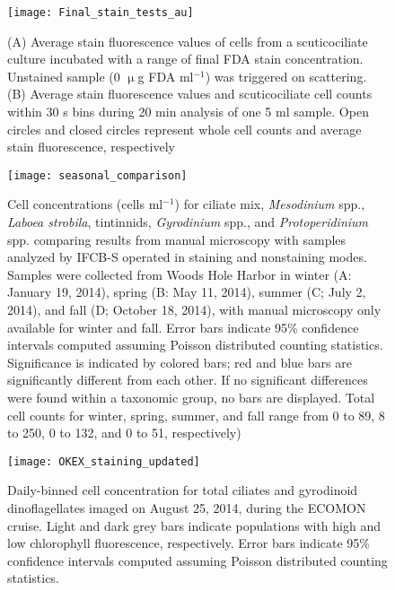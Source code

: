 \newpage
\begin{figure}

\graphicspath{ {Chapter2_Figures/} }
\texttt{[image: Final\_stain\_tests\_au]}
\caption [Testing stain protocol] {(A) Average stain fluorescence values of cells from a scuticociliate culture incubated with a range of final FDA stain concentration. Unstained sample (0 $\upmu$g FDA ml$^{-1}$) was triggered on scattering. (B) Average stain fluorescence values and scuticociliate cell counts within 30 s bins during 20 min analysis of one 5 ml sample. Open circles and closed circles represent whole cell counts and average stain fluorescence, respectively }
\label{arm:fig2}
\end{figure}

\begin{figure}

\graphicspath{ {Chapter2_Figures/} }
\texttt{[image: seasonal\_comparison]}
\caption [Seasonal comparisons between manual microscopy and IFCB-S] {Cell concentrations (cells ml$^{-1}$) for ciliate mix, \textit{Mesodinium} spp., \textit{Laboea strobila}, tintinnids, \textit{Gyrodinium} spp., and \textit{Protoperidinium} spp. comparing results from manual microscopy with samples analyzed by IFCB-S operated in staining and nonstaining modes. Samples were collected from Woods Hole Harbor in winter (A: January 19, 2014), spring (B: May 11, 2014), summer (C; July 2, 2014), and fall (D; October 18, 2014), with manual microscopy only available for winter and fall. Error bars indicate 95\% confidence intervals computed assuming Poisson distributed counting statistics. Significance is indicated by colored bars; red and blue bars are significantly different from each other. If no significant differences were found within a taxonomic group, no bars are displayed. Total cell counts for winter, spring, summer, and fall range from 0 to 89, 8 to 250, 0 to 132, and 0 to 51, respectively)}
\label{arm:fig2}
\end{figure}

\begin{figure}

\graphicspath{ {Chapter2_Figures/} }
\texttt{[image: OKEX\_staining\_updated]}
\caption [OKEX cruise comparison between staining and non-staining on IFCB-S] {Daily-binned cell concentration for total ciliates and gyrodinoid dinoflagellates imaged on August 25, 2014, during the ECOMON cruise. Light and dark grey bars indicate populations with high and low chlorophyll fluorescence, respectively. Error bars indicate 95\% confidence intervals computed assuming Poisson distributed counting statistics.}
\label{arm:fig2}
\end{figure}

